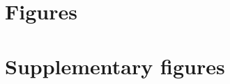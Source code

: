\documentclass[11pt, letterpaper]{article}
\begin{document}
\singlespacing
\clearpage


\doublespacing



\clearpage
\setcounter{figure}{0}
\section*{Figures}




\clearpage


\appendix

\renewcommand{\theequation}{A\arabic{equation}}
\renewcommand{\thetable}{A\arabic{table}}
\renewcommand{\thefigure}{A\arabic{figure}}
\setcounter{equation}{0}  %
\setcounter{figure}{0}
\setcounter{table}{0}
 
\section*{Supplementary figures} 
\end{document}
